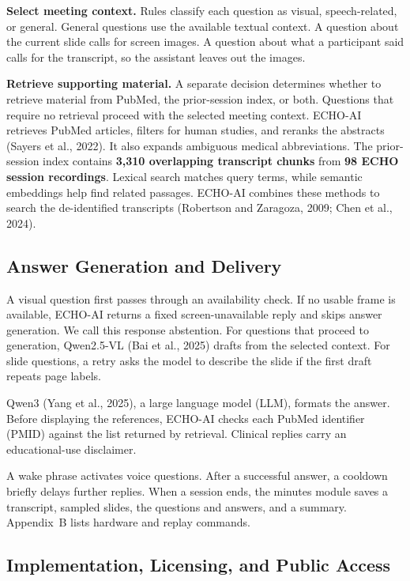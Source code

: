 \documentclass[11pt]{article}
\begin{document}
\textbf{Select meeting context.} Rules classify each question as visual, speech-related, or general. General questions use the available textual context. A question about the current slide calls for screen images. A question about what a participant said calls for the transcript, so the assistant leaves out the images.

\textbf{Retrieve supporting material.} A separate decision determines whether to retrieve material from PubMed, the prior-session index, or both. Questions that require no retrieval proceed with the selected meeting context. ECHO-AI retrieves PubMed articles, filters for human studies, and reranks the abstracts (Sayers et al., 2022). It also expands ambiguous medical abbreviations. The prior-session index contains \textbf{3,310 overlapping transcript chunks} from \textbf{98 ECHO session recordings}. Lexical search matches query terms, while semantic embeddings help find related passages. ECHO-AI combines these methods to search the de-identified transcripts (Robertson and Zaragoza, 2009; Chen et al., 2024).

\subsection{Answer Generation and Delivery}

A visual question first passes through an availability check. If no usable frame is available, ECHO-AI returns a fixed screen-unavailable reply and skips answer generation. We call this response abstention. For questions that proceed to generation, Qwen2.5-VL (Bai et al., 2025) drafts from the selected context. For slide questions, a retry asks the model to describe the slide if the first draft repeats page labels.

Qwen3 (Yang et al., 2025), a large language model (LLM), formats the answer. Before displaying the references, ECHO-AI checks each PubMed identifier (PMID) against the list returned by retrieval. Clinical replies carry an educational-use disclaimer.

A wake phrase activates voice questions. After a successful answer, a cooldown briefly delays further replies. When a session ends, the minutes module saves a transcript, sampled slides, the questions and answers, and a summary. Appendix~B lists hardware and replay commands.

\subsection{Implementation, Licensing, and Public Access}
\end{document}
